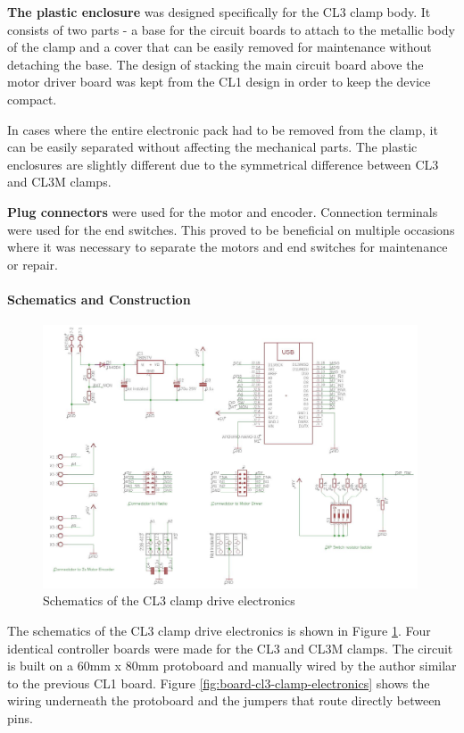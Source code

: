 \textbf{The plastic enclosure} was designed specifically for the CL3 clamp body. It consists of two parts - a base for the circuit boards to attach to the metallic body of the clamp and a cover that can be easily removed for maintenance without detaching the base. The design of stacking the main circuit board above the motor driver board was kept from the CL1 design in order to keep the device compact. 

In cases where the entire electronic pack had to be removed from the clamp, it can be easily separated without affecting the mechanical parts. The plastic enclosures are slightly different due to the symmetrical difference between CL3 and CL3M clamps. 

\textbf{Plug connectors} were used for the motor and encoder. Connection terminals were used for the end switches. This proved to be beneficial on multiple occasions where it was necessary to separate the motors and end switches for maintenance or repair.

\paragraph{Schematics and Construction}

\begin{figure}
    \centering
    \includegraphics[width=0.99\textwidth]{images/05/image61.jpg}
    \caption{Schematics of the CL3 clamp drive electronics}
    \label{fig:schematic-cl3-clamp-electronics}
\end{figure}


The schematics of the CL3 clamp drive electronics is shown in Figure \ref{fig:schematic-cl3-clamp-electronics}.
Four identical controller boards were made for the CL3 and CL3M clamps. The circuit is built on a 60mm x 80mm protoboard and manually wired by the author similar to the previous CL1 board. Figure \ref{fig:board-cl3-clamp-electronics} shows the wiring underneath the protoboard and the jumpers that route directly between pins.

